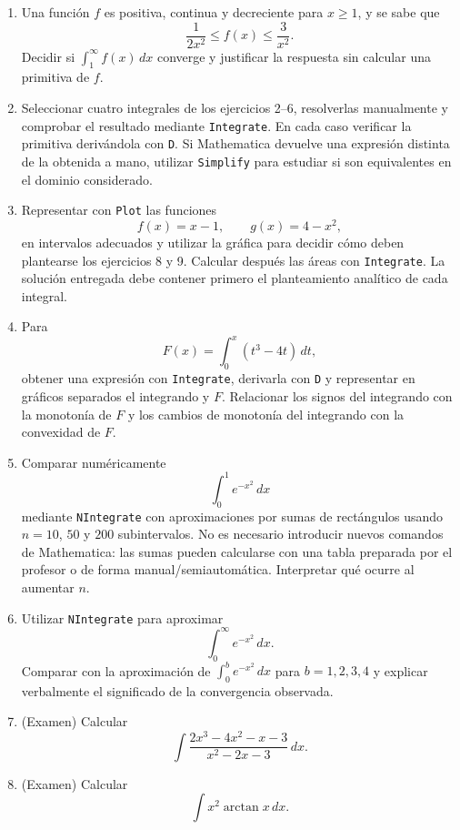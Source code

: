 \begin{enumerate}
\item Una función $f$ es positiva, continua y decreciente para $x\geq1$, y se sabe que
\[
\frac{1}{2x^2}\leq f(x)\leq\frac{3}{x^2}.
\]
Decidir si $\int_1^\infty f(x)\,dx$ converge y justificar la respuesta sin calcular una primitiva de $f$.

\item \M Seleccionar cuatro integrales de los ejercicios 2--6, resolverlas manualmente y comprobar el resultado mediante \texttt{Integrate}. En cada caso verificar la primitiva derivándola con \texttt{D}. Si Mathematica devuelve una expresión distinta de la obtenida a mano, utilizar \texttt{Simplify} para estudiar si son equivalentes en el dominio considerado.

\item \M Representar con \texttt{Plot} las funciones
\[
f(x)=x-1,
\qquad
g(x)=4-x^2,
\]
en intervalos adecuados y utilizar la gráfica para decidir cómo deben plantearse los ejercicios 8 y 9. Calcular después las áreas con \texttt{Integrate}. La solución entregada debe contener primero el planteamiento analítico de cada integral.

\item \M Para
\[
F(x)=\int_0^x(t^3-4t)\,dt,
\]
obtener una expresión con \texttt{Integrate}, derivarla con \texttt{D} y representar en gráficos separados el integrando y $F$. Relacionar los signos del integrando con la monotonía de $F$ y los cambios de monotonía del integrando con la convexidad de $F$.

\item \M Comparar numéricamente
\[
\int_0^1e^{-x^2}\,dx
\]
mediante \texttt{NIntegrate} con aproximaciones por sumas de rectángulos usando $n=10$, $50$ y $200$ subintervalos. No es necesario introducir nuevos comandos de Mathematica: las sumas pueden calcularse con una tabla preparada por el profesor o de forma manual/semiautomática. Interpretar qué ocurre al aumentar $n$.

\item \M Utilizar \texttt{NIntegrate} para aproximar
\[
\int_0^{\infty}e^{-x^2}\,dx.
\]
Comparar con la aproximación de $\int_0^b e^{-x^2}\,dx$ para $b=1,2,3,4$ y explicar verbalmente el significado de la convergencia observada.

\item (Examen) Calcular
\[
\int\frac{2x^3-4x^2-x-3}{x^2-2x-3}\,dx.
\]

\item (Examen) Calcular
\[
\int x^2\arctan x\,dx.
\]


\end{enumerate}

